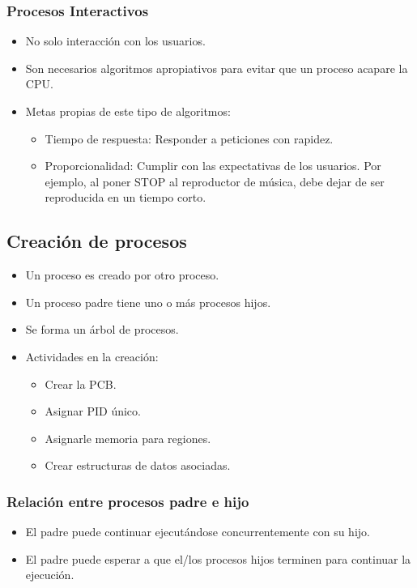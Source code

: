 \subsubsection{Procesos Interactivos}
\begin{itemize}
    \item No solo interacción con los usuarios.
    \item Son necesarios algoritmos apropiativos para evitar que un proceso acapare la CPU.
    \item Metas propias de este tipo de algoritmos:
    \begin{itemize}
        \item Tiempo de respuesta: Responder a peticiones con rapidez.
        \item Proporcionalidad: Cumplir con las expectativas de los usuarios. Por ejemplo, al poner STOP al reproductor de música, debe dejar de ser reproducida en un tiempo corto.
    \end{itemize}
\end{itemize}

\subsection{Creación de procesos}
\begin{itemize}
    \item Un proceso es creado por otro proceso.
    \item Un proceso padre tiene uno o más procesos hijos.
    \item Se forma un árbol de procesos.
    \item Actividades en la creación:
    \begin{itemize}
        \item Crear la PCB.
        \item Asignar PID único.
        \item Asignarle memoria para regiones.
        \item Crear estructuras de datos asociadas.
    \end{itemize}
\end{itemize}

\subsubsection{Relación entre procesos padre e hijo}
\begin{itemize}
    \item El padre puede continuar ejecutándose concurrentemente con su hijo.
    \item El padre puede esperar a que el/los procesos hijos terminen para continuar la ejecución.
\end{itemize}
